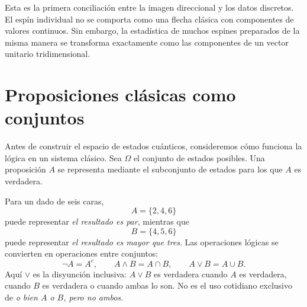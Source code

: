 \begin{classroomqa}
\end{classroomqa}

\begin{classroomqa}
\end{classroomqa}

Esta es la primera conciliación entre la imagen direccional y los datos discretos. El espín individual no se comporta como una flecha clásica con componentes de valores continuos. Sin embargo, la estadística de muchos espines preparados de la misma manera se transforma exactamente como las componentes de un vector unitario tridimensional.

\section{Proposiciones clásicas como conjuntos}

Antes de construir el espacio de estados cuánticos, consideremos cómo funciona la lógica en un sistema clásico. Sea \(\Omega\) el conjunto de estados posibles. Una proposición \(A\) se representa mediante el subconjunto de estados para los que \(A\) es verdadera.

Para un dado de seis caras,
\[
A=\{2,4,6\}
\]
puede representar \emph{el resultado es par}, mientras que
\[
B=\{4,5,6\}
\]
puede representar \emph{el resultado es mayor que tres}. Las operaciones lógicas se convierten en operaciones entre conjuntos:
\begin{equation}
\neg A=A^c,\qquad
A\land B=A\cap B,\qquad
A\lor B=A\cup B.
\label{eq:classical-logic}
\end{equation}
Aquí \(\lor\) es la disyunción inclusiva: \(A\lor B\) es verdadera cuando \(A\) es verdadera, cuando \(B\) es verdadera o cuando ambas lo son. No es el uso cotidiano exclusivo de \emph{o bien \(A\) o \(B\), pero no ambos}.


